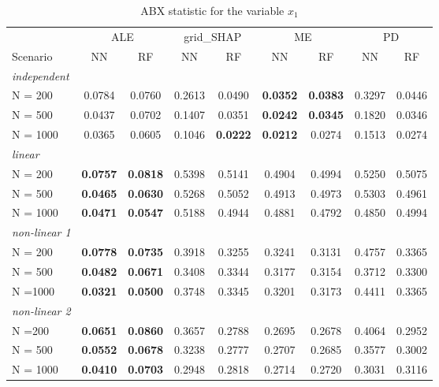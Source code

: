 \begin{table}[ht]
\caption{ABX statistic for the variable $x_1$}
\label{tbl:exp1_v1}
\centering
{}
\begin{tabular}{l|cc|cc|cc|cc}
\toprule
{} & \multicolumn{2}{|c}{ALE} & \multicolumn{2}{|c}{grid\_SHAP} & \multicolumn{2}{|c}{ME} & \multicolumn{2}{|c}{PD} \\
Scenario& NN & RF & NN & RF & NN & RF & NN & RF \\
\midrule
\textit{independent} & & & & & & & & \\
N = 200 &0.0784 &0.0760 &0.2613 &0.0490 &\textbf{0.0352} &\textbf{0.0383} &0.3297 &0.0446 \\
N = 500 &0.0437 &0.0702 &0.1407 &0.0351 &\textbf{0.0242} &\textbf{0.0345} &0.1820 &0.0346 \\ 
N = 1000 &0.0365 &0.0605 &0.1046 &\textbf{0.0222} &\textbf{0.0212} &0.0274 &0.1513 &0.0274 \\
\midrule
\textit{linear} & & & & & & & & \\
N = 200 &\textbf{0.0757} &\textbf{0.0818} &0.5398	&0.5141	&0.4904	&0.4994	&0.5250	&0.5075\\
N = 500 &\textbf{0.0465	}&\textbf{0.0630}	&0.5268	&0.5052	&0.4913	&0.4973	&0.5303	&0.4961\\  
N = 1000 &\textbf{0.0471} &\textbf{0.0547} &0.5188 &0.4944 &0.4881 &0.4792 &0.4850 &0.4994 \\
\midrule
\textit{non-linear 1}& & & & & & & & \\
N = 200 &\textbf{0.0778}	&\textbf{0.0735}	&0.3918	&0.3255	&0.3241	&0.3131	&0.4757	&0.3365 \\
N = 500 &\textbf{0.0482}	&\textbf{0.0671}	&0.3408	&0.3344	&0.3177 &0.3154	&0.3712	&0.3300\\
N =1000 &\textbf{0.0321}	&\textbf{0.0500}	&0.3748	&0.3345	&0.3201	&0.3173	&0.4411	&0.3365 \\
\midrule
\textit{non-linear 2} & & & & & & & & \\
N =200 &\textbf{0.0651}	&\textbf{0.0860}	&0.3657	&0.2788	&0.2695	&0.2678	&0.4064	&0.2952 \\
N = 500 &\textbf{0.0552}	&\textbf{0.0678}	&0.3238	&0.2777	&0.2707	&0.2685	&0.3577	&0.3002 \\ 
N = 1000 &\textbf{0.0410} &\textbf{0.0703} &0.2948 &0.2818 &0.2714 &0.2720 &0.3031	&0.3116  \\
\bottomrule
\end{tabular}
\end{table}



